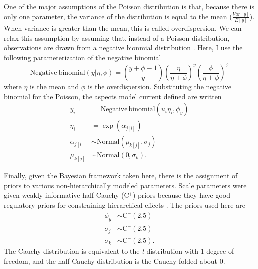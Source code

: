 \documentclass[12pt,letterpaper]{article}
\begin{document}
One of the major assumptions of the Poisson distribution is that, because there is only one parameter, the variance of the distribution is equal to the mean (\(\frac{Var[y]}{E[y]}\)). When variance is greater than the mean, this is called overdispersion. We can relax this assumption by assuming that, instead of a Poisson distribution, observations are drawn from a negative bionmial distribution \citep{Gelman2007}. Here, I use the following parameterization of the negative binomial 
\begin{equation}
  \mathrm{Negative\ binomial}(y | \eta, \phi) = {y + \phi -1 \choose y} \left(\frac{\eta}{\eta + \phi}\right)^{y} \left(\frac{\phi}{\eta + \phi}\right)^{\phi}
  \label{eq:neg_bin}
\end{equation}
where \(\eta\) is the mean and \(\phi\) is the overdispersion. Substituting the negative binomial for the Poisson, the aspects model current defined are written
\begin{align}
  y_{i} &= \mathrm{Negative\ binomial}(u_{i}\eta_{i}, \phi_{y}) \nonumber \\
  \eta_{i} &= \exp(\alpha_{j[i]}) \nonumber \\
  \alpha_{j[i]} &\sim \mathrm{Normal}(\mu_{k[j]}, \sigma_{j}) \nonumber \\
  \mu_{k[j]} &\sim \mathrm{Normal}(0, \sigma_{k}).
  \label{eq:nb_mod}
\end{align}

Finally, given the Bayesian framework taken here, there is the assignment of priors to various non-hierarchically modeled parameters. Scale parameters were given weakly informative half-Cauchy (C\(^{+}\)) priors because they have good regulatory priors for constraining hierarchical effects \citep{Gelman2006,Gelman2013b}. The priors used here are
\begin{align*}
  \phi_{y} &\sim \mathrm{C^{+}}(2.5) \\
  \sigma_{j} &\sim \mathrm{C^{+}}(2.5) \\
  \sigma_{k} &\sim \mathrm{C^{+}}(2.5).
\end{align*}
The Cauchy distribution is equivalent to the \textit{t}-distribution with 1 degree of freedom, and the half-Cauchy distribution is the Cauchy folded about 0.
\end{document}
